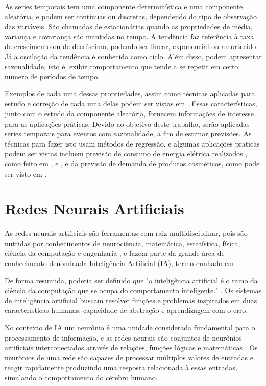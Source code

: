             As series temporais tem uma componente determinística e uma componente aleatória, e podem ser contínuas ou discretas, dependendo do tipo de observação das variáveis. São chamadas de estacionárias quando as propriedades de média, variança e covariança são mantidas no tempo. A tendência faz referência à taxa de crescimento ou de decréscimo, podendo ser linear, exponencial ou amortecido. Já a oscilação da tendência é conhecida como ciclo. Além disso, podem apresentar sazonalidade, isto é, exibir comportamento que tende a se repetir em certo numero de períodos de tempo.
    
            Exemplos de cada uma dessas propriedades, assim como técnicas aplicadas para estudo e correção de cada uma delas podem ser vistas em \cite{tecnicas1}. Essas características, junto com o estudo da componente aleatória, fornecem informações de interesse para as aplicações práticas.  
            Devido ao objetivo deste trabalho, serão aplicadas series temporais para eventos com sazonalidade, a fim de estimar previsões. As técnicas para fazer isto usam métodos de regressão,  e algumas aplicações praticas podem ser vistas incluem  previsão de consumo de energia elétrica realizados , como feito em  ,  e , e da previsão de demanda de produtos cosméticos, como pode ser visto em .
    
    \section{Redes Neurais Artificiais}
    
        As redes neurais artificiais são ferramentas com raiz multidisciplinar, pois são nutridas por conhecimentos de neurociência, matemática, estatística, física, ciência da computação e engenharia \cite{Haykin1994}, e fazem parte da grande área de conhecimento denominada Inteligência Artificial (IA), termo cunhado em \cite{kaplan2019siri}.
        
        De forma resumida, poderia ser definido que "a inteligência artificial é o ramo da ciência da computação que se ocupa do comportamento inteligente." \cite{Luger2004}. Os sistemas de inteligência artificial buscam resolver funções e problemas inspirados em duas características humanas: capacidade de abstração e aprendizagem com o erro. 
        
        No contexto de IA um neurônio é uma unidade considerada fundamental para o processamento de informação, e as redes neurais são conjuntos de neurônios artificiais interconectados através de relações, funções lógicas e matemáticas \cite{Haykin1994}. Os neurônios de uma rede são capazes de processar múltiplos valores de entradas e reagir rapidamente produzindo uma resposta relacionada à essas entradas, simulando o comportamento do cérebro humano. 
        

